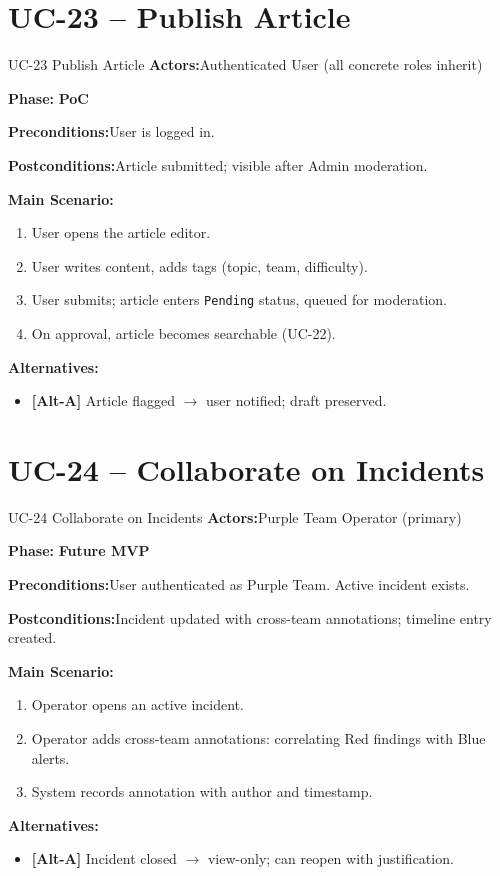 \documentclass[12pt,a4paper]{report}
\newcommand{\ucfield}[2]{%
    \noindent\textbf{\color{helixpurplemid}#1:}\quad #2\par\medskip
}
\newcommand{\ucphase}[1]{%
    \noindent\textbf{\color{helixpurplemid}Phase:}\quad%
    \ifstrequal{#1}{PoC}{\textcolor{helixteal}{\textbf{PoC}}}{\textcolor{helixamber}{\textbf{Future MVP}}}%
    \par\medskip
}
\begin{document}
\section{UC-23 -- Publish Article}
\begin{ucbox}{UC-23 \quad Publish Article}
    \ucfield{Actors}{Authenticated User (all concrete roles inherit)}
    \ucphase{PoC}
    \ucfield{Preconditions}{User is logged in.}
    \ucfield{Postconditions}{Article submitted; visible after Admin moderation.}
    \textbf{\color{helixpurplemid}Main Scenario:}
    \begin{enumerate}
        \item User opens the article editor.
        \item User writes content, adds tags (topic, team, difficulty).
        \item User submits; article enters \texttt{Pending} status, queued for moderation.
        \item On approval, article becomes searchable (UC-22).
    \end{enumerate}
    \textbf{\color{helixpurplemid}Alternatives:}
    \begin{itemize}
        \item \textbf{[Alt-A]} Article flagged $\rightarrow$ user notified; draft preserved.
    \end{itemize}
\end{ucbox}

\section{UC-24 -- Collaborate on Incidents}
\begin{ucbox}{UC-24 \quad Collaborate on Incidents}
    \ucfield{Actors}{Purple Team Operator (primary)}
    \ucphase{Future MVP}
    \ucfield{Preconditions}{User authenticated as Purple Team. Active incident exists.}
    \ucfield{Postconditions}{Incident updated with cross-team annotations; timeline entry created.}
    \textbf{\color{helixpurplemid}Main Scenario:}
    \begin{enumerate}
        \item Operator opens an active incident.
        \item Operator adds cross-team annotations: correlating Red findings with Blue alerts.
        \item System records annotation with author and timestamp.
    \end{enumerate}
    \textbf{\color{helixpurplemid}Alternatives:}
    \begin{itemize}
        \item \textbf{[Alt-A]} Incident closed $\rightarrow$ view-only; can reopen with justification.
    \end{itemize}
\end{ucbox}
\end{document}

